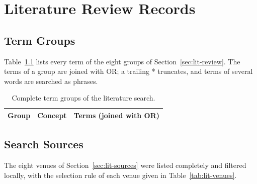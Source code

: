 \chapter{Literature Review Records}
\label{app:literature}

\section{Term Groups}
\label{app:lit-groups}
Table~\ref{tab:lit-groups-full} lists every term of the eight groups of
Section~\ref{sec:lit-review}. The terms of a group are joined with OR; a
trailing * truncates, and terms of several words are searched as phrases.

\begin{table}[H]
\centering
\begin{singlespace}
\caption[Complete term groups of the literature search]{Complete term groups of
the literature search.}
\label{tab:lit-groups-full}
\small
\begin{tabularx}{\textwidth}{@{}l>{\raggedright\arraybackslash}p{3.3cm}>{\raggedright\arraybackslash}X@{}}
\toprule
\textbf{Group} & \textbf{Concept} & \textbf{Terms (joined with OR)} \\
\midrule
\end{tabularx}
\end{singlespace}
\end{table}

\section{Search Sources}
\label{app:lit-sources}
The eight venues of Section~\ref{sec:lit-sources} were listed completely and filtered
locally, with the selection rule of each venue given in Table~\ref{tab:lit-venues}.

